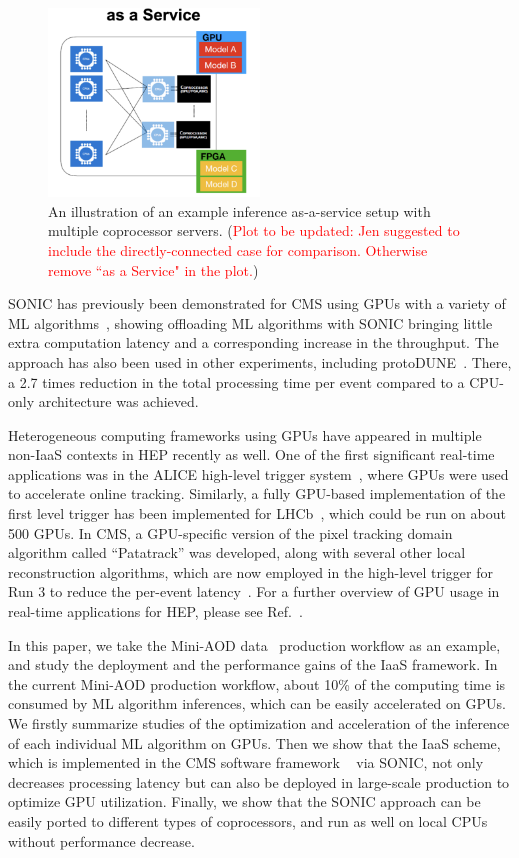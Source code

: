 \begin{figure}[htp]
    \centering
    \includegraphics[width=0.50\textwidth]{plots/illustration.png}
    \caption{An illustration of an example inference as-a-service setup with multiple coprocessor servers. (\textcolor{red}{Plot to be updated: Jen suggested to include the directly-connected case for comparison. Otherwise remove ``as a Service" in the plot.})}
    \label{fig:illustration}
\end{figure}


SONIC has previously been demonstrated for CMS using GPUs with a variety of ML algorithms~\cite{Krupa:2020bwg}, showing offloading ML algorithms with SONIC bringing little extra computation latency and a corresponding increase in the throughput.
The approach has also been used in other experiments, including protoDUNE~\cite{Wang:2020fjr}. There, a 2.7 times reduction in the total processing time per event compared to a CPU-only architecture was achieved.

Heterogeneous computing frameworks using GPUs have appeared in multiple non-IaaS contexts in HEP recently as well. One of the first significant real-time applications was in the ALICE high-level trigger system~\cite{ALICE:2018phe}, where GPUs were used to accelerate online tracking. Similarly, a fully GPU-based implementation of the first level trigger has been implemented for LHCb~\cite{Aaij:2019zbu}, which could be run on about 500 GPUs. In CMS, a GPU-specific version of the pixel tracking domain algorithm called ``Patatrack'' was developed, along with several other local reconstruction algorithms, which are now employed in the high-level trigger for Run 3 to reduce the per-event latency~\cite{Bocci:2020pmi}. For a further overview of GPU usage in real-time applications for HEP, please see Ref.~\cite{VomBruch:2020plx}.

In this paper, we take the Mini-AOD data~\cite{Petrucciani:2015gjw} production workflow as an example, and study the deployment and the performance gains of the IaaS framework. In the current Mini-AOD production workflow, about 10\% of the computing time is consumed by ML algorithm inferences, which can be easily accelerated on GPUs. We firstly summarize studies of the optimization and acceleration of the inference of each individual ML algorithm on GPUs. Then we show that the IaaS scheme, which is implemented in the CMS software framework \CMSSW~\cite{CMS:2006myw} via SONIC, not only decreases processing latency but can also be deployed in large-scale production to optimize GPU utilization. Finally, we show that the SONIC approach can be easily ported to different types of coprocessors, and run as well on local CPUs without performance decrease.

